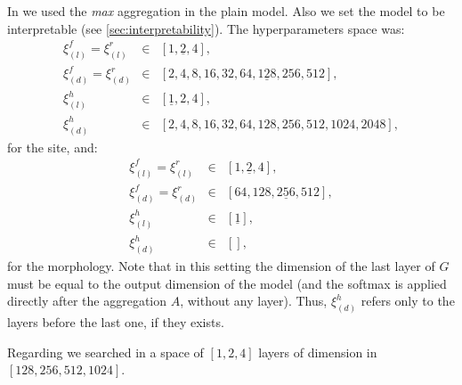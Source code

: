 In \maxi{} we used the \emph{max} aggregation in the plain
model. Also we set the model to be interpretable (see
\cref{sec:interpretability}). The hyperparameters space was:
\begin{align*}
  \xi_{(l)}^f=\xi_{(l)}^r&\in&[1,\underline{2},4],\\
  \xi_{(d)}^f=\xi_{(d)}^r&\in&[2,4,8,16,32,64,\underline{128},256,512],\\
  \xi_{(l)}^h&\in&[\underline{1},2,4],\\
  \xi_{(d)}^h&\in&[2,4,8,16,32,64,128,256,512,1024,2048],
\end{align*}
for the site, and:
\begin{align*}
  \xi_{(l)}^f=\xi_{(l)}^r&\in&[1,\underline{2},4],\\
  \xi_{(d)}^f=\xi_{(d)}^r&\in&[64,128,\underline{256},512],\\
  \xi_{(l)}^h&\in&[\underline{1}],\\
  \xi_{(d)}^h&\in&[],
\end{align*}
for the morphology. Note that in this setting the dimension of the
last layer of $G$ must be equal to the output dimension of the model
(and the softmax is applied directly after the aggregation $A$,
without any layer). Thus, $\xi_{(d)}^h$ refers only to the
layers before the last one, if they exists.

Regarding \gru{} we searched in a space of $[1,2,4]$ layers of
dimension in $[128,256,512,1024]$.




